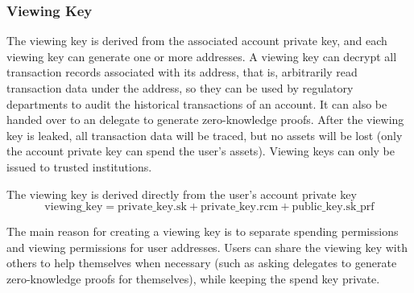 \subsubsection{Viewing Key}\label{section: viewing-key}

The viewing key is derived from the associated account private key, and each viewing key can generate one or more addresses. A viewing key can decrypt all transaction records associated with its address, that is, arbitrarily read transaction data under the address, so they can be used by regulatory departments to audit the historical transactions of an account. It can also be handed over to an delegate to generate zero-knowledge proofs. After the viewing key is leaked, all transaction data will be traced, but no assets will be lost (only the account private key can spend the user's assets). Viewing keys can only be issued to trusted institutions.

The viewing key is derived directly from the user's account private key
\[ \mathrm{viewing\_key} = \mathrm{private\_key.sk} + \mathrm{private\_key.rcm} + \mathrm{public\_key.sk\_prf} \]

The main reason for creating a viewing key is to separate spending permissions and viewing permissions for user addresses. Users can share the viewing key with others to help themselves when necessary (such as asking delegates to generate zero-knowledge proofs for themselves), while keeping the spend key private.
